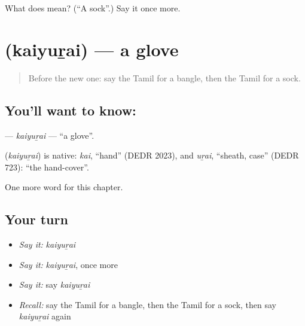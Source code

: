 \begin{tcolorbox}[breakable,colback=teal!4,colframe=teal!35!black,title={Before you move on}]
What does  mean? (\textquotedblleft{}A sock\textquotedblright{}.) Say it once more.
\end{tcolorbox}
\section[\texorpdfstring{\ta{கையுறை} (kaiyuṟai)}{கையுறை (kaiyuṟai)}]{ (kaiyuṟai) — a glove}

\label{lesson:TA-C137-kaiyurai}



\begin{quote}
Before the new one: say the Tamil for a bangle, then the Tamil for a sock.
\end{quote}

\subsection*{You'll want to know: }
\textbf{} — \emph{kaiyuṟai} — \textquotedblleft{}a glove\textquotedblright{}.

\begin{cousinweb}
\textbf{} (\emph{kaiyuṟai}) is native: \emph{kai}, \textquotedblleft{}hand\textquotedblright{} (DEDR 2023), and \emph{uṟai}, \textquotedblleft{}sheath, case\textquotedblright{} (DEDR 723): \textquotedblleft{}the hand-cover\textquotedblright{}.
\end{cousinweb}

\begin{grammarlens}[title={What you've built}]
One more word for this chapter.
\end{grammarlens}

\subsection*{Your turn}
\begin{itemize}
\raggedright
  \item \emph{Say it:} \emph{kaiyuṟai}
  \item \emph{Say it:} \emph{kaiyuṟai}, once more
  \item \emph{Say it:} say \emph{kaiyuṟai}
  \item \emph{Recall:} say the Tamil for a bangle, then the Tamil for a sock, then say \emph{kaiyuṟai} again
\end{itemize}

